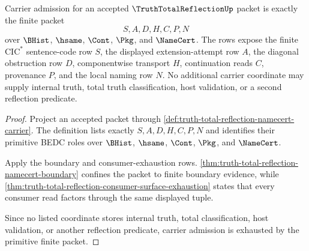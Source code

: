 \begin{theorem}
\label{thm:truth-total-reflection-carrier-primitive-scope}
Carrier admission for an accepted $\TruthTotalReflectionUp$ packet is exactly the finite packet
$$
S,A,D,H,C,P,N
$$
over $\BHist$, $\hsame$, $\Cont$, $\Pkg$, and $\NameCert$. The rows expose the finite $\mathrm{CIC}^{*}$ sentence-code row $S$, the displayed extension-attempt row $A$, the diagonal obstruction row $D$, componentwise transport $H$, continuation reads $C$, provenance $P$, and the local naming row $N$. No additional carrier coordinate may supply internal truth, total truth classification, host validation, or a second reflection predicate.
\end{theorem}
\begin{proof}
Project an accepted packet through \autoref{def:truth-total-reflection-namecert-carrier}. The definition lists exactly $S,A,D,H,C,P,N$ and identifies their primitive BEDC roles over $\BHist$, $\hsame$, $\Cont$, $\Pkg$, and $\NameCert$.

Apply the boundary and consumer-exhaustion rows. \autoref{thm:truth-total-reflection-namecert-boundary} confines the packet to finite boundary evidence, while \autoref{thm:truth-total-reflection-consumer-surface-exhaustion} states that every consumer read factors through the same displayed tuple.

Since no listed coordinate stores internal truth, total classification, host validation, or another reflection predicate, carrier admission is exhausted by the primitive finite packet.
\end{proof}

